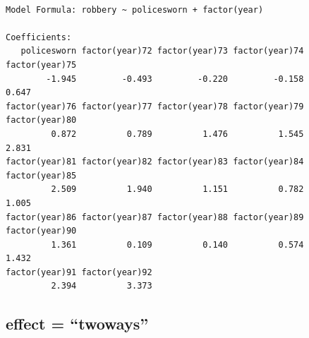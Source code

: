 \documentclass[]{book}
\newenvironment{Shaded}{\begin{snugshade}}{\end{snugshade}}
\newcommand{\CommentTok}[1]{\textcolor[rgb]{0.56,0.35,0.01}{\textit{#1}}}
\newcommand{\DataTypeTok}[1]{\textcolor[rgb]{0.13,0.29,0.53}{#1}}
\newcommand{\DecValTok}[1]{\textcolor[rgb]{0.00,0.00,0.81}{#1}}
\newcommand{\KeywordTok}[1]{\textcolor[rgb]{0.13,0.29,0.53}{\textbf{#1}}}
\newcommand{\NormalTok}[1]{#1}
\newcommand{\OperatorTok}[1]{\textcolor[rgb]{0.81,0.36,0.00}{\textbf{#1}}}
\newcommand{\StringTok}[1]{\textcolor[rgb]{0.31,0.60,0.02}{#1}}
\begin{document}
\begin{verbatim}

Model Formula: robbery ~ policesworn + factor(year)

Coefficients:
   policesworn factor(year)72 factor(year)73 factor(year)74 factor(year)75 
        -1.945         -0.493         -0.220         -0.158          0.647 
factor(year)76 factor(year)77 factor(year)78 factor(year)79 factor(year)80 
         0.872          0.789          1.476          1.545          2.831 
factor(year)81 factor(year)82 factor(year)83 factor(year)84 factor(year)85 
         2.509          1.940          1.151          0.782          1.005 
factor(year)86 factor(year)87 factor(year)88 factor(year)89 factor(year)90 
         1.361          0.109          0.140          0.574          1.432 
factor(year)91 factor(year)92 
         2.394          3.373 
\end{verbatim}

\hypertarget{effect-twoways}{%
\subsection{effect = ``twoways''}\label{effect-twoways}}

\begin{Shaded}
\end{Shaded}
\end{document}

